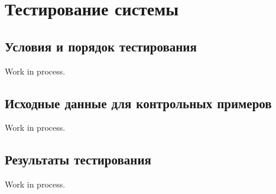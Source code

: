 \section{Тестирование системы}

\subsection{Условия и порядок тестирования}

Work in process.

\subsection{Исходные данные для контрольных примеров}

Work in process.

\subsection{Результаты тестирования}

Work in process.

\clearpage
\newpage